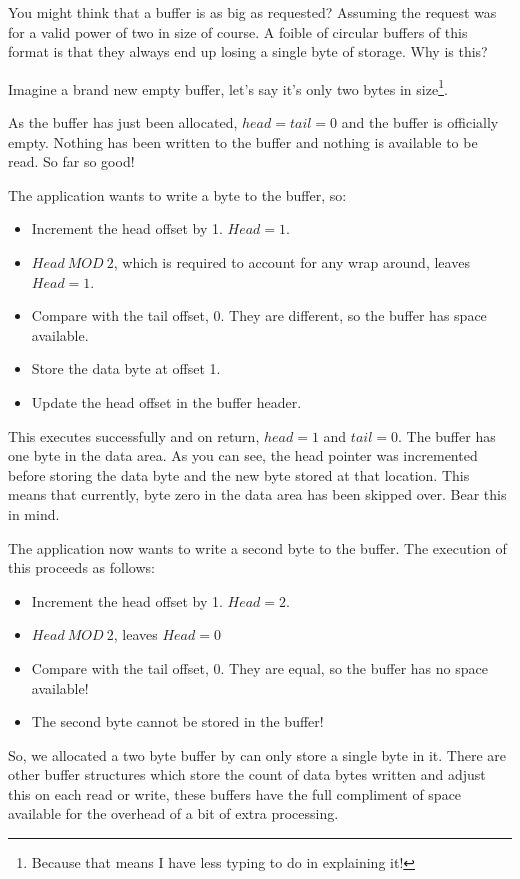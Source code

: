 You might think that a buffer is as big as requested? Assuming the
request was for a valid power of two in size of course. A foible of
circular buffers of this format is that they always end up losing
a single byte of storage. Why is this?

Imagine a brand new empty buffer, let's say it's only two bytes in
size\footnote{Because that means I have less typing to do in explaining it!}. 

As the buffer has just been allocated, $head=tail=0$ and the buffer
is officially empty. Nothing has been written to the buffer and nothing
is available to be read. So far so good!

The application wants to write a byte to the buffer, so:
\begin{itemize}
\item Increment the head offset by 1. $Head=1$.
\item $Head\ MOD\ 2$, which is required to account for any wrap around,
leaves $Head=1$.
\item Compare with the tail offset, 0. They are different, so the buffer
has space available.
\item Store the data byte at offset 1.
\item Update the head offset in the buffer header.
\end{itemize}
This executes successfully and on return, $head=1$ and $tail=0$.
The buffer has one byte in the data area. As you can see, the head
pointer was incremented before storing the data byte and the new byte
stored at that location. This means that currently, byte zero in the
data area has been skipped over. Bear this in mind.

The application now wants to write a second byte to the buffer. The
execution of this proceeds as follows:
\begin{itemize}
\item Increment the head offset by 1. $Head=2$.
\item $Head\ MOD\ 2$, leaves $Head=0$
\item Compare with the tail offset, 0. They are equal, so the buffer has
no space available!
\item The second byte cannot be stored in the buffer!
\end{itemize}
So, we allocated a two byte buffer by can only store a single byte
in it. There are other buffer structures which store the count of
data bytes written and adjust this on each read or write, these buffers
have the full compliment of space available for the overhead of a
bit of extra processing.

